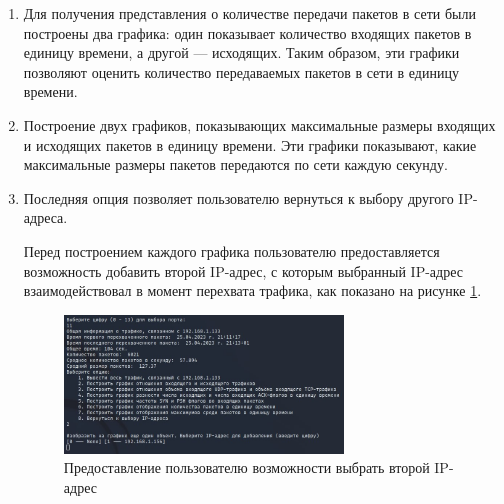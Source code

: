 \documentclass[bachelor, och, coursework]{SCWorks}
\begin{document}
\begin{enumerate}
\begin{enumerate}
    Частота PSH-флагов вычисляется по формуле 
    
    \begin{center}
      $r_{psh} = \frac{V_{P_{in}}}{V_{tcp}}$,
    \end{center}
    
    где $V_{P_{in}}$ число входящих TCP-пакетов, в которых установлен флаг PSH = 1, $V_{tcp}$ --- число входящих TCP-пакетов в единицу времени.
    Флаг PSH (Push) в TCP-заголовке используется для указания конечной точке передачи данных о том, что все буферизованные данные должны быть 
    немедленно отправлены получателю, а не ждать буферизации следующих данных. Когда отправитель устанавливает флаг PSH в заголовке TCP-сегмента, 
    он указывает получателю, что данные в этом сегменте должны быть переданы верхнему уровню протокола немедленно, без буферизации на приемной стороне.
    Таким образом, если значение величины $r_{psh}$ резко возросло в некоторый промежуток времени, значит за это время
    одно устройcтво успело передать другому устройству большое количество пакетов.

    \item Для получения представления о количестве передачи пакетов в сети были построены два графика: один показывает количество входящих пакетов 
    в единицу времени, а другой --- исходящих. Таким образом, эти графики позволяют оценить количество передаваемых пакетов в сети в единицу времени.
    \item Построение двух графиков, показывающих максимальные размеры входящих и исходящих пакетов в единицу времени. Эти графики показывают, какие 
    максимальные размеры пакетов передаются по сети каждую секунду.
    \item Последняя опция позволяет пользователю вернуться к выбору другого IP-адреса.

    Перед построением каждого графика пользователю предоставляется возможность добавить второй IP-адрес, с которым выбранный IP-адрес взаимодействовал 
    в момент перехвата трафика, как показано на рисунке \ref{cmd-2ndip}.

    \begin{figure}[H]
      \centering
      \includegraphics[width=0.7\textwidth]{photo/cmd-2ndip.jpg}
      \caption{Предоставление пользователю возможности выбрать второй IP-адрес}
      \label{cmd-2ndip}
    \end{figure}


\end{enumerate}
\end{enumerate}
\end{document}
